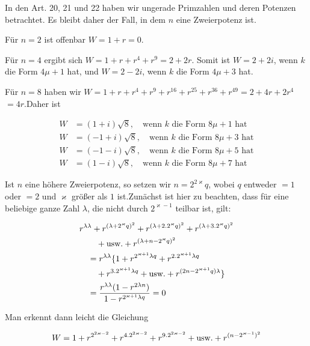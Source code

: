 In den Art. 20, 21 und 22 haben wir ungerade Primzahlen und deren Potenzen betrachtet. Es bleibt daher der Fall, in dem $n$ eine Zweierpotenz ist.

Für $n=2$ ist offenbar $W=1+r=0$.

Für $n=4$ ergibt sich $W=1+r+r^4+r^9=2+2r$. Somit ist $W=2+2i$, wenn $k$ die Form $4\mu+1$ hat, und $W=2-2i$, wenn $k$ die Form $4\mu+3$ hat.

Für $n=8$ haben wir $W=1+r+r^4+r^9+r^{16}+r^{25}+r^{36}+r^{49}=2+4r+2r^4$ $=4r$.\quad Daher ist

\[
\begin{aligned}
W&=(1+i)\surd8,\quad\text{wenn }k\text{ die Form }8\mu+1\text{ hat}\\
W&=(-1+i)\surd8,\quad\text{wenn }k\text{ die Form }8\mu+3\text{ hat}\\
W&=(-1-i)\surd8,\quad\text{wenn }k\text{ die Form }8\mu+5\text{ hat}\\
W&=(1-i)\surd8,\quad\text{wenn }k\text{ die Form }8\mu+7\text{ hat}
\end{aligned}
\]

Ist $n$ eine höhere Zweierpotenz, so setzen wir $n=2^{2\varkappa}q$, wobei $q$ entweder $=1$ oder $=2$ und $\varkappa$ größer als $1$ ist.\quad Zunächst ist hier zu beachten, dass für eine beliebige ganze Zahl $\lambda$, die nicht durch $2^{\varkappa-1}$ teilbar ist, gilt:

\[
\begin{aligned}
&r^{\lambda\lambda}+r^{(\lambda+2^\varkappa q)^2}+r^{(\lambda+2\mathbin{.}2^\varkappa q)^2}+r^{(\lambda+3\mathbin{.}2^\varkappa q)^2}\\&\qquad+\text{usw.}+r^{(\lambda+n-2^\varkappa q)^2}\\
&\quad=r^{\lambda\lambda}\{1+r^{2^{\varkappa+1}\lambda q}+r^{2\mathbin{.}2^{\varkappa+1}\lambda q}\\&\qquad+r^{3\mathbin{.}2^{\varkappa+1}\lambda q}+\text{usw.}+r^{(2n-2^{\varkappa+1}q)\lambda}\}\\&\quad=\frac{r^{\lambda\lambda}(1-r^{2\lambda n})}{1-r^{2^{\varkappa+1}\lambda q}}=0
\end{aligned}
\]

Man erkennt dann leicht die Gleichung

\[
\begin{aligned}
W=1+r^{2^{2\varkappa-2}}+r^{4\mathbin{.}2^{2\varkappa-2}}+r^{9\mathbin{.}2^{2\varkappa-2}}+\text{usw.}+r^{(n-2^{\varkappa-1})^2}
\end{aligned}
\]


